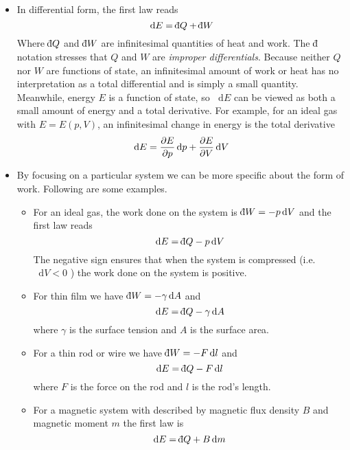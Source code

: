 \documentclass[11pt, a4paper]{article}
\newcommand{\diff}{\mathop{}\!\mathrm{d}} %
\newcommand{\dbar}{{\mathchar '26\mkern -11mu \mathrm{d}}} %
\begin{document}
\begin{itemize}
	\item In differential form, the first law reads
	\begin{equation*}
		\diff E = \dbar Q + \dbar W
	\end{equation*}
	Where $ \dbar Q $ and $ \dbar W $ are infinitesimal quantities of heat and work. The $ \dbar $ notation stresses that $ Q $ and $ W $ are \textit{improper differentials}. Because neither $ Q $ nor $ W $ are functions of state, an infinitesimal amount of work or heat has no interpretation as a total differential and is simply a small quantity. Meanwhile, energy $ E $ is a function of state, so $ \diff E $ can be viewed as both a small amount of energy and a total derivative. For example, for an ideal gas with $ E = E(p, V) $, an infinitesimal change in energy is the total derivative
	\begin{equation*}
		\diff E = \pdv{E}{p}\diff p + \pdv{E}{V}\diff V
	\end{equation*}
	
	\item By focusing on a particular system we can be more specific about the form of work. Following are some examples.
	\begin{itemize}
		\item For an ideal gas, the work done on the system is $ \dbar W = - p \diff V $ and the first law reads
		\begin{equation*}
			\diff E = \dbar Q - p\diff V
		\end{equation*}
		The negative sign ensures that when the system is compressed (i.e. $ \diff V < 0 $ ) the work done on the system is positive. 	
		
		\item For thin film we have $ \dbar W = - \gamma \diff A $ and
		\begin{equation*}
			\diff E = \dbar Q - \gamma \diff A
		\end{equation*}
		where $ \gamma $ is the surface tension and $ A $ is the surface area.
		
		\item For a thin rod or wire we have $ \dbar W = - F \diff l $ and
		\begin{equation*}
			\diff E = \dbar Q - F \diff l
		\end{equation*}
		where $ F $ is the force on the rod and $ l $ is the rod's length.
		
		\item For a magnetic system with described by magnetic flux density $ B $ and magnetic moment $ m $ the first law is
		\begin{equation*}
			\diff E = \dbar Q + B \diff m
		\end{equation*}
		

\end{itemize}
\end{itemize}
\end{document}
